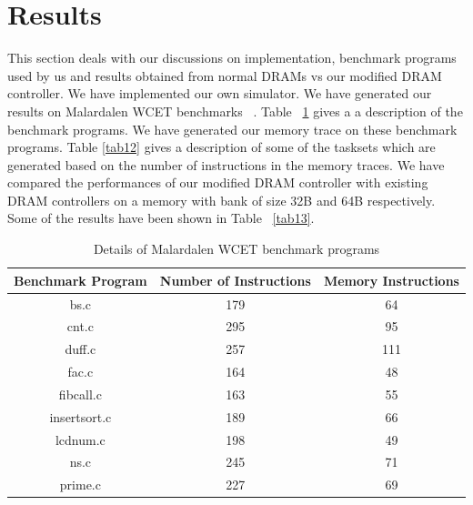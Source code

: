 \section{Results}\label{res2}
This section deals with our discussions on implementation, benchmark programs used by us and results obtained from normal DRAMs
vs our modified DRAM controller. We have implemented our own simulator. We have generated our results on Malardalen WCET
benchmarks ~\cite{gustafsson2010malardalen}. Table ~\ref{tab11} gives a a description of the benchmark programs. We have 
generated our memory trace on these benchmark programs. Table \ref{tab12} gives a description of some of the tasksets 
which are generated based on the number of instructions in the memory traces. We have compared the performances of our 
modified DRAM controller with existing DRAM controllers on a memory with bank of size 32B and 64B respectively. 
Some of the results have been shown in Table ~\ref{tab13}.

\begin{table}
 \begin{tabular}{|c|c|c|}\hline 
 {\bf Benchmark Program} & {\bf Number of Instructions} & {\bf Memory Instructions} \\ \hline
 bs.c & 179 & 64 \\ \hline
 cnt.c & 295 & 95 \\ \hline 
 duff.c & 257 & 111 \\ \hline
 fac.c & 164 & 48 \\ \hline
 fibcall.c & 163 & 55 \\ \hline
 insertsort.c & 189 & 66 \\ \hline
 lcdnum.c & 198 & 49 \\ \hline
 ns.c & 245 & 71 \\ \hline
 prime.c & 227 & 69 \\ \hline
 \end{tabular}
\caption{Details of Malardalen WCET benchmark programs}
\label{tab11}
\end{table}



